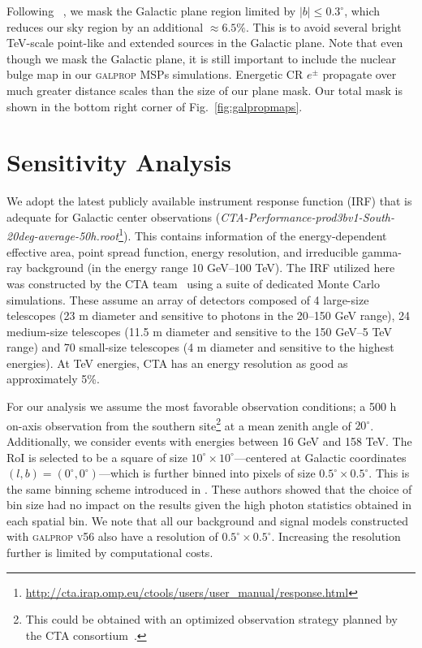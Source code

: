 \documentclass[doublespace,nopageskip]{VTthesis} %
\begin{document}
Following ~\cite{Rinchiuso:2020skh}, we mask the Galactic plane region limited by $\lvert b \rvert \leq 0.3^\circ$, which reduces our sky region by an additional $\approx 6.5\%$. This is to avoid several bright TeV-scale point-like and extended sources in the Galactic plane. Note that even though we mask the Galactic plane, it is still important to include the nuclear bulge map in our \textsc{galprop} MSPs simulations. Energetic CR $e^{\pm}$ propagate over much greater distance scales than the size of our plane mask. Our total mask is shown in the bottom right corner of Fig.~\ref{fig:galpropmaps}.

\section{Sensitivity Analysis}
\label{sec:sensitivity}

We adopt the latest publicly available instrument response function (IRF) that is adequate for Galactic center observations (\textit{CTA-Performance-prod3bv1-South-20deg-average-50h.root}\footnote{\url{http://cta.irap.omp.eu/ctools/users/user_manual/response.html}}). This contains information of the energy-dependent effective area, point spread function, energy resolution, and irreducible gamma-ray background (in the energy range 10 GeV--100 TeV). The IRF utilized here was constructed by the CTA team~\citep{CTA_IRFs:2015} using a suite of dedicated Monte Carlo simulations. These assume an array of detectors composed of 4 large-size telescopes (23 m diameter and sensitive to photons in the 20--150 GeV range),  24 medium-size telescopes (11.5 m diameter and sensitive to the 150 GeV--5 TeV range) and 70 small-size telescopes (4 m diameter and sensitive to the highest energies). At TeV energies, CTA has an energy resolution as good as approximately 5\%.


For our analysis we assume the most favorable observation conditions; a 500 h on-axis observation from the southern site\footnote{This could be obtained with an optimized observation strategy planned by the CTA consortium~\citep{Acharyya:2020sbj}.} at a mean zenith angle of $20^\circ$. Additionally, we consider events with energies between 16 GeV and 158 TeV. The RoI is selected to be a square of size $10^\circ \times 10^\circ$---centered at Galactic coordinates $(l,b)=(0^\circ, 0^\circ)$---which is further binned into pixels of size $0.5^\circ \times 0.5^\circ$. This is the same binning scheme introduced in \cite{Rinchiuso:2020skh}. These authors showed that the choice of bin size had no impact on the results given the high photon statistics obtained in each spatial bin. We note that all our background and signal models constructed with \textsc{galprop v56} also have a resolution of $0.5^\circ \times 0.5^\circ$. Increasing the resolution further is limited by computational costs.  
\end{document}
